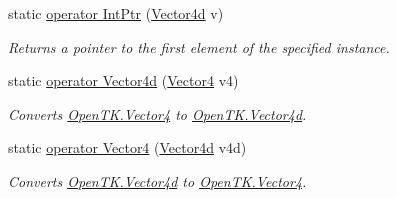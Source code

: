 \begin{DoxyCompactItemize}
static \hyperlink{struct_open_t_k_1_1_vector4d_ab3d74f12e6d5ff0a10321e799e8635f6}{operator Int\-Ptr} (\hyperlink{struct_open_t_k_1_1_vector4d}{Vector4d} v)
\begin{DoxyCompactList}\small\item\em Returns a pointer to the first element of the specified instance. \end{DoxyCompactList}\item 
static \hyperlink{struct_open_t_k_1_1_vector4d_a8ab9439229f4e38c361937ec8101712d}{operator Vector4d} (\hyperlink{struct_open_t_k_1_1_vector4}{Vector4} v4)
\begin{DoxyCompactList}\small\item\em Converts \hyperlink{struct_open_t_k_1_1_vector4}{Open\-T\-K.\-Vector4} to \hyperlink{struct_open_t_k_1_1_vector4d}{Open\-T\-K.\-Vector4d}.\end{DoxyCompactList}\item 
static \hyperlink{struct_open_t_k_1_1_vector4d_ae6746585987080cd5fd87c572d958564}{operator Vector4} (\hyperlink{struct_open_t_k_1_1_vector4d}{Vector4d} v4d)
\begin{DoxyCompactList}\small\item\em Converts \hyperlink{struct_open_t_k_1_1_vector4d}{Open\-T\-K.\-Vector4d} to \hyperlink{struct_open_t_k_1_1_vector4}{Open\-T\-K.\-Vector4}.\end{DoxyCompactList}\end{DoxyCompactItemize}

